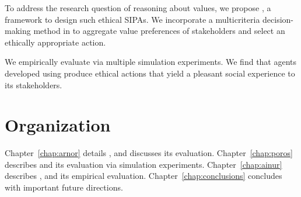 To address the research question of reasoning about values, we 
propose \frameworkAinur, a framework to design such ethical 
SIPAs. We incorporate a multicriteria decision-making method 
in \frameworkAinur to aggregate value preferences of stakeholders and 
select an ethically appropriate action. 

 
We empirically evaluate \frameworkAinur via multiple simulation 
experiments. We find that agents developed using \frameworkAinur produce ethical actions that 
yield a pleasant social experience to its stakeholders.

\section{Organization}
Chapter~\ref{chap:arnor} details \frameworkA, and discusses its evaluation. 
Chapter~\ref{chap:poros} describes \frameworkB and its 
evaluation via simulation experiments. 
Chapter~\ref{chap:ainur} describes \frameworkAinur, and its empirical evaluation.  
Chapter~\ref{chap:conclusions} concludes with important future directions.